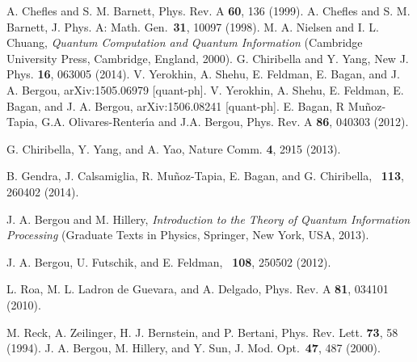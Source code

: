 \documentclass[aps,pra,twocolumn,showpacs]{revtex4-1}
\begin{document}
\begin{thebibliography}{99}


 A. Chefles and S. M. Barnett, Phys. Rev. A {\bf60}, 136 (1999).
 A. Chefles and S. M. Barnett, J. Phys. A: Math. Gen.~{\bf 31}, 10097 (1998).
 M. A. Nielsen and I. L. Chuang, {\it Quantum Computation and
Quantum Information} (Cambridge University Press, Cambridge,
England, 2000).
 G. Chiribella and Y. Yang, New J. Phys. {\bf16}, 063005 (2014).
 V. Yerokhin, A. Shehu, E. Feldman, E. Bagan, and J. A. Bergou, arXiv:1505.06979 [quant-ph].
 V. Yerokhin, A. Shehu, E. Feldman, E. Bagan, and J. A. Bergou, arXiv:1506.08241 [quant-ph].
 E. Bagan, R Mu\~noz-Tapia, G.A. Olivares-Renter\'{\i}a and J.A. Bergou, Phys. Rev. A {\bf86}, 040303 (2012).

 G. Chiribella, Y. Yang, and A. Yao, Nature Comm. \textbf{4}, 2915 (2013).

  B. Gendra, J. Calsamiglia, R. Mu{\~ n}oz-Tapia, E. Bagan, and G. Chiribella, \prl~{\bf 113}, 260402 (2014).


J. A. Bergou and M. Hillery, {\em Introduction to the Theory of Quantum Information Processing} (Graduate Texts in Physics, Springer, New York, USA, 2013).

 J. A. Bergou, U. Futschik, and E. Feldman, \prl~{\bf 108}, 250502 (2012).

L. Roa, M. L. Ladron de Guevara, and A. Delgado, Phys. Rev. A {\bf 81}, 034101 (2010).

 M. Reck, A. Zeilinger, H. J. Bernstein, and P. Bertani, Phys. Rev. Lett. \textbf{73}, 58 (1994).
 J. A. Bergou, M. Hillery, and Y. Sun, J. Mod. Opt.~\textbf{47}, 487 (2000).

\end{thebibliography}    
\end{document}
